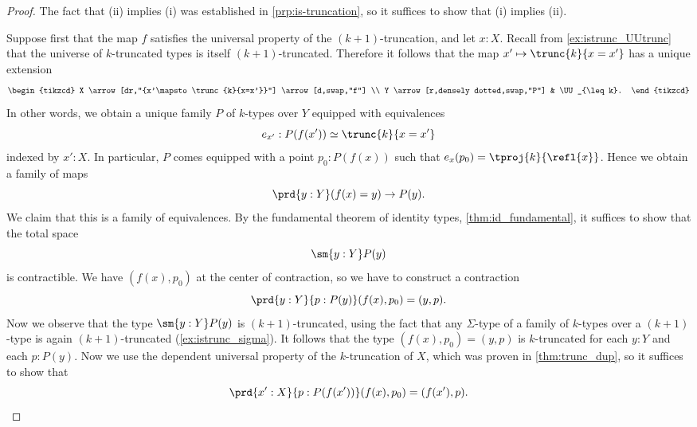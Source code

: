 \begin{proof}
  The fact that (ii) implies (i) was established in \cref{prp:is-truncation}, so it suffices to show that (i) implies (ii).
  
  Suppose first that the map $f$ satisfies the universal property of the $(k+1)$-truncation, and let $x:X$. Recall from \cref{ex:istrunc_UUtrunc} that the universe of $k$-truncated types is itself $(k+1)$-truncated. Therefore it follows that the map $x'\mapsto \trunc{k}{x=x'}$ has a unique extension
  \begin{equation*}
    \begin{tikzcd}
      X \arrow[dr,"{x'\mapsto\trunc{k}{x=x'}}"] \arrow[d,swap,"f"] \\
      Y \arrow[r,densely dotted,swap,"P"] & \UU_{\leq k}.
    \end{tikzcd}
  \end{equation*}
  In other words, we obtain a unique family $P$ of $k$-types over $Y$ equipped with equivalences
  \begin{equation*}
    e_{x'}:P(f(x'))\simeq \trunc{k}{x=x'}
  \end{equation*}
  indexed by $x':X$. In particular, $P$ comes equipped with a point $p_0:P(f(x))$ such that $e_x(p_0)=\tproj{k}{\refl{x}}$. Hence we obtain a family of maps
  \begin{equation*}
    \prd{y:Y} (f(x)=y)\to P(y).
  \end{equation*}
  We claim that this is a family of equivalences. By the fundamental theorem of identity types, \cref{thm:id_fundamental}, it suffices to show that the total space
  \begin{equation*}
    \sm{y:Y}P(y)
  \end{equation*}
  is contractible. We have $(f(x),p_0)$ at the center of contraction, so we have to construct a contraction
  \begin{equation*}
    \prd{y:Y}{p:P(y)} (f(x),p_0)=(y,p).
  \end{equation*}
  Now we observe that the type $\sm{y:Y}P(y)$ is $(k+1)$-truncated, using the fact that any $\Sigma$-type of a family of $k$-types over a $(k+1)$-type is again $(k+1)$-truncated (\cref{ex:istrunc_sigma}). It follows that the type $(f(x),p_0)=(y,p)$ is $k$-truncated for each $y:Y$ and each $p:P(y)$. Now we use the dependent universal property of the $k$-truncation of $X$, which was proven in \cref{thm:trunc_dup}, so it suffices to show that
  \begin{equation*}
    \prd{x':X}{p:P(f(x'))} (f(x),p_0)=(f(x'),p).

\end{equation*}
\end{proof}
